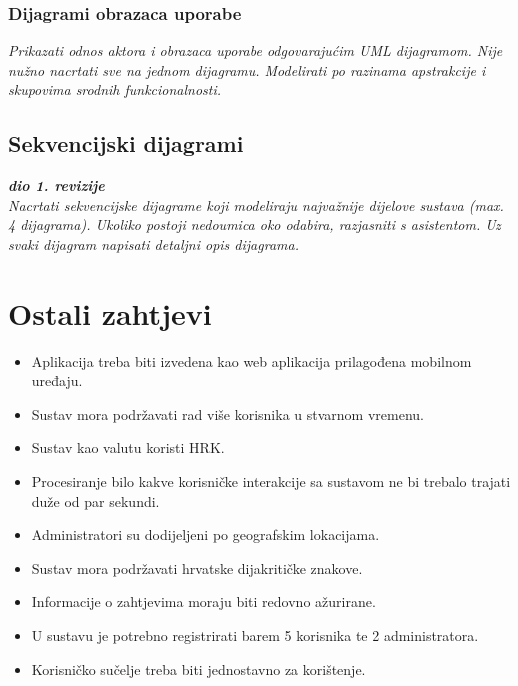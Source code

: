 					
					
				\subsubsection{Dijagrami obrazaca uporabe}
					
					\textit{Prikazati odnos aktora i obrazaca uporabe odgovarajućim UML dijagramom. Nije nužno nacrtati sve na jednom dijagramu. Modelirati po razinama apstrakcije i skupovima srodnih funkcionalnosti.}
				\eject		
				
			\subsection{Sekvencijski dijagrami}
				
				\textbf{\textit{dio 1. revizije}}\\
				
				\textit{Nacrtati sekvencijske dijagrame koji modeliraju najvažnije dijelove sustava (max. 4 dijagrama). Ukoliko postoji nedoumica oko odabira, razjasniti s asistentom. Uz svaki dijagram napisati detaljni opis dijagrama.}
				\eject
	
		\section{Ostali zahtjevi}
		
		\begin{itemize}
			\item Aplikacija treba biti izvedena kao web aplikacija prilagođena mobilnom uređaju.
			\item Sustav mora podržavati rad više korisnika u stvarnom vremenu.
			\item Sustav kao valutu koristi HRK.
			\item Procesiranje bilo kakve korisničke interakcije sa sustavom ne bi trebalo trajati duže od par sekundi.
			\item Administratori su dodijeljeni po geografskim lokacijama.
			\item Sustav mora podržavati hrvatske dijakritičke znakove.
			\item Informacije o zahtjevima moraju biti redovno ažurirane.
			\item U sustavu je potrebno registrirati barem 5 korisnika te 2 administratora.
			\item Korisničko sučelje treba biti jednostavno za korištenje.
		\end{itemize}
			 
			 
			 
	